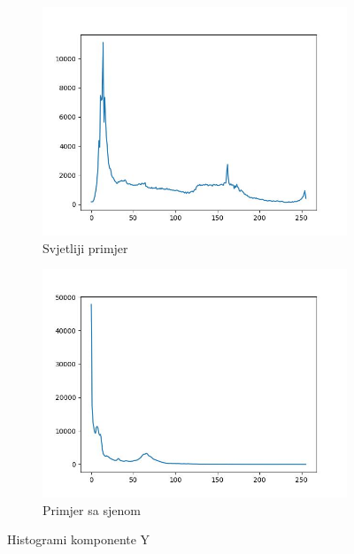 \documentclass[times, utf8, diplomski]{fer}
\begin{document}
\begin{figure}[H]
\begin{subfigure}[b]{0.4\textwidth}
         \centering
         \includegraphics[width=\textwidth]{figures/ce_examples/3/hist_original.jpg}
         \caption{Svjetliji primjer}
     \end{subfigure}
     \begin{subfigure}[b]{0.4\textwidth}
         \centering
         \includegraphics[width=\textwidth]{figures/ce_examples/4/hist_original.jpg}
         \caption{Primjer sa sjenom}
     \end{subfigure}
        \caption{Histogrami komponente Y}
        \label{fig:ce_hist_original}
\end{figure}
\end{document}
